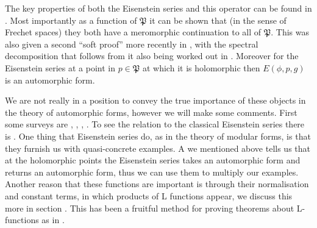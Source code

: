 The key properties of both the Eisenstein series and this operator can be found in \cite[IV.1.8, IV.1.9, IV.1.10, IV.1.11]{moeglinSpectralDecompositionEisenstein1995}. Most importantly as a function of \(\mathfrak{P}\) it can be shown that (in the sense of Frechet spaces) they both have a meromorphic continuation to all of \(\mathfrak{P}\). This was also given a second ``soft proof'' more recently in \cite{bernsteinMeromorphicContinuationEisenstein2022}, with the spectral decomposition that follows from it also being worked out in \cite{delormeSpectralTheoremLanglands2021}. Moreover for the Eisenstein series at a point in \(p\in \mathfrak{P}\) at which it is holomorphic then \(E(\phi,p, g)\) is an automorphic form. 

We are not really in a position to convey the true importance of these objects in the theory of automorphic forms, however we will make some comments. First some surveys are \cite{lapidPerspectivesEisensteinSeries2022}, \cite{arthurEisensteinSeriesTrace1979}, \cite{kimEISENSTEINSERIESTHEIR}, \cite{jiangResiduesEisensteinSeries2008a}. To see the relation to the classical Eisenstein series there is \cite{garrettTransitionEisensteinSeries2016}. One thing that Eisenstein series do, as in the theory of modular forms, is that they furnish us with quasi-concrete examples. A we mentioned above \cite[IV.1.9.(b).i]{moeglinSpectralDecompositionEisenstein1995} tells us that at the holomorphic points the Eisenstein series takes an automorphic form and returns an automorphic form, thus we can use them to multiply our examples. Another reason that these functions are important is through their normalisation and constant terms, in which products of L functions appear, we discuss this more in section . This has been a fruitful method for proving theorems about L-functions as in \cite{shahidiEisensteinSeriesAutomorphic2010}\cite{pollackRANKINSELBERGMETHODUSER}\cite{arthurEisensteinSeriesTrace1979}.

